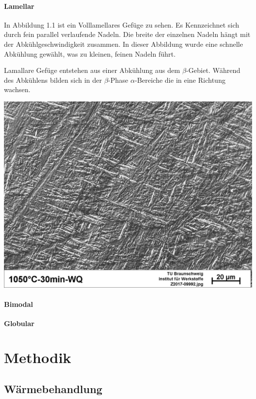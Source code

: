 \documentclass[a4paper, 11pt]{tubsreprt}
\begin{document}
\subsubsection{Lamellar}
In Abbildung 1.1 ist ein Volllamellares Gefüge zu sehen. Es Kennzeichnet sich durch fein parallel verlaufende Nadeln. Die breite der einzelnen Nadeln hängt mit der Abkühlgeschwindigkeit zusammen. In dieser Abbildung wurde eine schnelle Abkühlung gewählt, was zu kleinen, feinen Nadeln führt. 

Lamallare Gefüge entstehen aus einer Abkühlung aus dem $\beta$-Gebiet. Während des Abkühlens bilden sich in der $\beta$-Phase $\alpha$-Bereiche die in eine Richtung wachsen. 

\begin{minipage}{\textwidth}


	\centering
		\includegraphics[scale=0.5]{Bilder/Vollmartensit.jpg}
		\label{fig1}
		
\end{minipage}


\subsubsection{Bimodal}
\subsubsection{Globular}
\chapter{Methodik}
\section{Wärmebehandlung}
\end{document}
